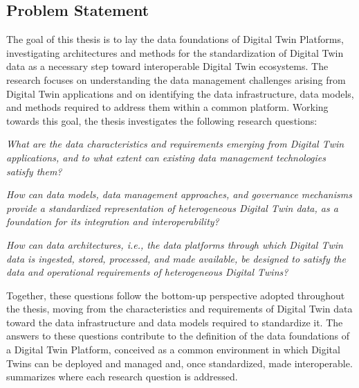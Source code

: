 \subsection*{Problem Statement}

The goal of this thesis is to lay the data foundations of Digital Twin Platforms, investigating architectures and methods for the standardization of Digital Twin data as a necessary step toward interoperable Digital Twin ecosystems.
The research focuses on understanding the data management challenges arising from Digital Twin applications and on identifying the data infrastructure, data models, and methods required to address them within a common platform.
%
Working towards this goal, the thesis investigates the following research questions:

\begin{rqlist}
\item[RQ1] \textit{What are the data characteristics and requirements emerging from Digital Twin applications, and to what extent can existing data management technologies satisfy them?}

\item[RQ2] \textit{How can data models, data management approaches, and governance mechanisms provide a standardized representation of heterogeneous Digital Twin data, as a foundation for its integration and interoperability?}

\item[RQ3] \textit{How can data architectures, i.e., the data platforms through which Digital Twin data is ingested, stored, processed, and made available, be designed to satisfy the data and operational requirements of heterogeneous Digital Twins?}

\end{rqlist}

Together, these questions follow the bottom-up perspective adopted throughout the thesis, moving from the characteristics and requirements of Digital Twin data toward the data infrastructure and data models required to standardize it. The answers to these questions contribute to the definition of the data foundations of a Digital Twin Platform, conceived as a common environment in which Digital Twins can be deployed and managed and, once standardized, made interoperable.  summarizes where each research question is addressed.

